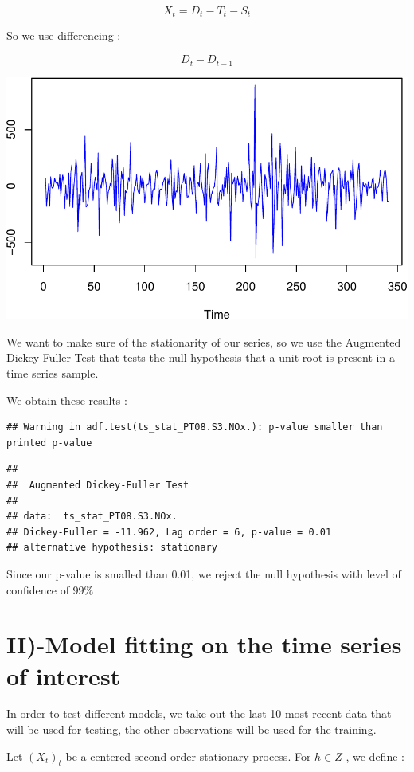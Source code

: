 \documentclass[]{article}
\begin{document}
\[
X_t = D_t - T_t - S_t
\]

So we use differencing :

\[
D_t - D_{t-1}
\]

\includegraphics{rapport_files/figure-latex/unnamed-chunk-15-1.pdf}

We want to make sure of the stationarity of our series, so we use the
Augmented Dickey-Fuller Test that tests the null hypothesis that a unit
root is present in a time series sample.

We obtain these results :

\begin{verbatim}
## Warning in adf.test(ts_stat_PT08.S3.NOx.): p-value smaller than printed p-value
\end{verbatim}

\begin{verbatim}
## 
##  Augmented Dickey-Fuller Test
## 
## data:  ts_stat_PT08.S3.NOx.
## Dickey-Fuller = -11.962, Lag order = 6, p-value = 0.01
## alternative hypothesis: stationary
\end{verbatim}

Since our p-value is smalled than 0.01, we reject the null hypothesis
with level of confidence of 99\%

\section{II)-Model fitting on the time series of interest}

In order to test different models, we take out the last 10 most recent
data that will be used for testing, the other observations will be used
for the training.

Let \((X_t)_t\) be a centered second order stationary process. For
\(h \in Z\) , we define :
\end{document}

